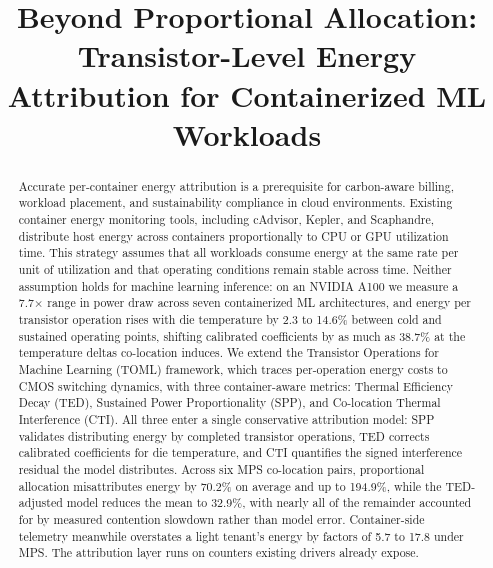 \documentclass[conference]{IEEEtran}
\begin{document}
\title{Beyond Proportional Allocation: Transistor-Level Energy Attribution for Containerized ML Workloads}

\author{
}

\maketitle

\begin{abstract}
Accurate per-container energy attribution is a prerequisite for carbon-aware billing, workload placement, and sustainability compliance in cloud environments. Existing container energy monitoring tools, including cAdvisor, Kepler, and Scaphandre, distribute host energy across containers proportionally to CPU or GPU utilization time. This strategy assumes that all workloads consume energy at the same rate per unit of utilization and that operating conditions remain stable across time. Neither assumption holds for machine learning inference: on an NVIDIA A100 we measure a 7.7$\times$ range in power draw across seven containerized ML architectures, and energy per transistor operation rises with die temperature by 2.3 to 14.6\% between cold and sustained operating points, shifting calibrated coefficients by as much as 38.7\% at the temperature deltas co-location induces. We extend the Transistor Operations for Machine Learning (TOML) framework, which traces per-operation energy costs to CMOS switching dynamics, with three container-aware metrics: Thermal Efficiency Decay (TED), Sustained Power Proportionality (SPP), and Co-location Thermal Interference (CTI). All three enter a single conservative attribution model: SPP validates distributing energy by completed transistor operations, TED corrects calibrated coefficients for die temperature, and CTI quantifies the signed interference residual the model distributes. Across six MPS co-location pairs, proportional allocation misattributes energy by 70.2\% on average and up to 194.9\%, while the TED-adjusted model reduces the mean to 32.9\%, with nearly all of the remainder accounted for by measured contention slowdown rather than model error. Container-side telemetry meanwhile overstates a light tenant's energy by factors of 5.7 to 17.8 under MPS. The attribution layer runs on counters existing drivers already expose.
\end{abstract}
\end{document}
